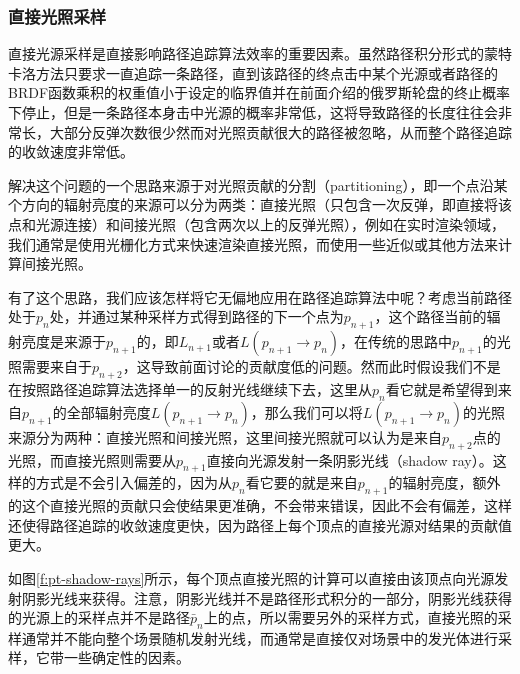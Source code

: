 \subsubsection{直接光照采样}\label{sec:pt-direct-illumination}
直接光源采样是直接影响路径追踪算法效率的重要因素。虽然路径积分形式的蒙特卡洛方法只要求一直追踪一条路径，直到该路径的终点击中某个光源或者路径的BRDF函数乘积的权重值小于设定的临界值并在前面介绍的俄罗斯轮盘的终止概率下停止，但是一条路径本身击中光源的概率非常低，这将导致路径的长度往往会非常长，大部分反弹次数很少然而对光照贡献很大的路径被忽略，从而整个路径追踪的收敛速度非常低。

解决这个问题的一个思路来源于对光照贡献的分割（partitioning），即一个点沿某个方向的辐射亮度的来源可以分为两类：直接光照（只包含一次反弹，即直接将该点和光源连接）和间接光照（包含两次以上的反弹光照），例如在实时渲染领域，我们通常是使用光栅化方式来快速渲染直接光照，而使用一些近似或其他方法来计算间接光照。

有了这个思路，我们应该怎样将它无偏地应用在路径追踪算法中呢？考虑当前路径处于$p_{n}$处，并通过某种采样方式得到路径的下一个点为$p_{n+1}$，这个路径当前的辐射亮度是来源于$p_{n+1}$的，即$L_{n+1}$或者$L(p_{n+1}\to p_n)$，在传统的思路中$p_{n+1}$的光照需要来自于$p_{n+2}$，这导致前面讨论的贡献度低的问题。然而此时假设我们不是在按照路径追踪算法选择单一的反射光线继续下去，这里从$p_n$看它就是希望得到来自$p_{n+1}$的全部辐射亮度$L(p_{n+1}\to p_n)$，那么我们可以将$L(p_{n+1}\to p_n)$的光照来源分为两种：直接光照和间接光照，这里间接光照就可以认为是来自$p_{n+2}$点的光照，而直接光照则需要从$p_{n+1}$直接向光源发射一条阴影光线（shadow ray）。这样的方式是不会引入偏差的，因为从$p_{n}$看它要的就是来自$p_{n+1}$的辐射亮度，额外的这个直接光照的贡献只会使结果更准确，不会带来错误，因此不会有偏差，这样还使得路径追踪的收敛速度更快，因为路径上每个顶点的直接光源对结果的贡献值更大。

如图\ref{f:pt-shadow-rays}所示，每个顶点直接光照的计算可以直接由该顶点向光源发射阴影光线来获得。注意，阴影光线并不是路径形式积分的一部分，阴影光线获得的光源上的采样点并不是路径$\bar{p}_n$上的点，所以需要另外的采样方式，直接光照的采样通常并不能向整个场景随机发射光线，而通常是直接仅对场景中的发光体进行采样，它带一些确定性的因素。

